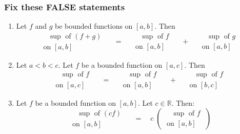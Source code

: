 \documentclass[14pt]{beamer}
\begin{document}
\begin{frame}[t]
	\fontsize{13}{13}\selectfont
	\frametitle{Fix these FALSE statements}

	\begin{enumerate}
		\item Let $f$ and $g$ be bounded functions on $[a,b]$. Then
			\[
				\; \substack{\text{ $\sup$ of $(f+g)$} \\ \text{on $[a,b]$} }\; \quad = \quad
				\; \substack{\text{ $\sup$ of $f$} \\ \text{on $[a,b]$} }\; \quad + \quad
				\; \substack{\text{ $\sup$ of $g$} \\ \text{on $[a,b]$} }\;
			\]

			\vfill

		\item Let $a < b < c$. Let $f$ be a bounded function on $[a,c]$. Then
			\[
				\; \substack{\text{ $\sup$ of $f$} \\ \text{on $[a,c]$} }\; \quad = \quad
				\; \substack{\text{ $\sup$ of $f$} \\ \text{on $[a,b]$} }\; \quad + \quad
				\; \substack{\text{ $\sup$ of $f$} \\ \text{on $[b,c]$} }\;
			\]

			\vfill

		\item Let $f$ be a bounded function on $[a,b]$. Let $c \in \mathbb{R}$. Then:
			\[
				\; \substack{\text{ $\sup$ of $(cf)$} \\ \text{on $[a,b]$} }\; \quad = \quad
				c \; \left( \; \substack{\text{ $\sup$ of $f$} \\ \text{on $[a,b]$} }\; \right
				)
			\]
	\end{enumerate}
\end{frame}
\end{document}
